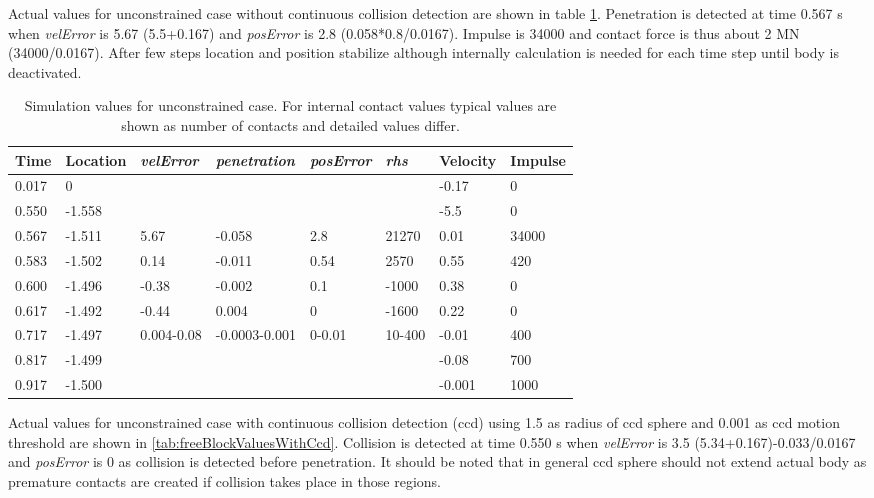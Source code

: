 Actual values for unconstrained case without continuous collision detection
are shown in table \ref{tab:freeBlockValues}. Penetration is detected at time 0.567 s when
{\it velError} is 5.67 (5.5+0.167) and
{\it posError} is 2.8 (0.058*0.8/0.0167). Impulse is 34000 and contact force is thus about 2 MN (34000/0.0167).
After few steps location and position stabilize although internally calculation is needed for each time step
until body is deactivated.

\begin {table}[htb!]
\begin{center}
\begin{tabular}{|l| l|l| l|l|l|l|l|}
\hline
{\bf Time} & 
{\bf Location} &
{\it velError} & {\it penetration} & {\it posError} & {\it rhs} &
{\bf Velocity} & 
{\bf Impulse} \\  \hline
0.017 &  0 & & & &  &-0.17 & 0 \\  \hline
0.550 &  -1.558 & & & & & -5.5 & 0 \\  \hline
0.567 &  -1.511 & 5.67 &-0.058 &2.8 &  21270 & 0.01 & 34000 \\  \hline
0.583 &  -1.502 & 0.14 &-0.011 & 0.54& 2570  & 0.55 & 420 \\  \hline
0.600 &  -1.496 & -0.38&-0.002 & 0.1  & -1000& 0.38 & 0 \\  \hline
0.617 &  -1.492 &-0.44 & 0.004 & 0     & -1600& 0.22 & 0 \\  \hline
0.717 &  -1.497 &0.004-0.08  &-0.0003-0.001 &0-0.01 & 10-400 & -0.01 & 400 \\  \hline
0.817 &  -1.499 & & & & & -0.08 & 700 \\  \hline
0.917 &  -1.500 & & & & & -0.001 & 1000 \\  \hline
\end {tabular}
\end{center}
\caption {Simulation values for unconstrained case. 
For internal contact values typical values are shown
as number of contacts and detailed values differ.} 
\label{tab:freeBlockValues} 
\end {table}

Actual values for unconstrained case with continuous collision detection (ccd) using 1.5 
as radius of ccd sphere and 0.001 as ccd motion threshold
are shown in \ref{tab:freeBlockValuesWithCcd}. Collision is detected at time 0.550 s when
{\it velError} is  3.5 (5.34+0.167)-0.033/0.0167 and
{\it posError} is  0 as collision is detected before penetration. 
It should be noted that in general ccd sphere should not extend actual body as 
premature contacts are created if collision takes place in those regions.

